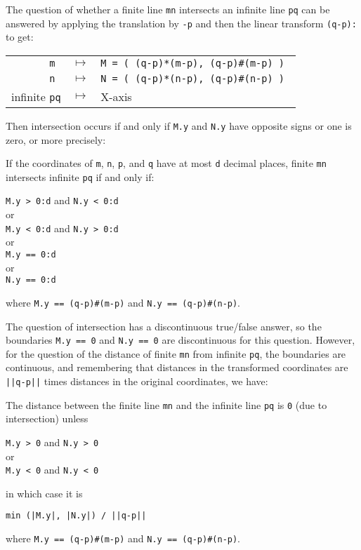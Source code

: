 \documentclass[12pt]{article}
\begin{document}
The question of whether a finite line {\tt mn} intersects an
infinite line {\tt pq} can be answered by applying the translation
by {\tt -p} and then the linear transform {\tt (q-p):} to get:
\begin{center}
\begin{tabular}{rcl}
\tt m & $\longmapsto$ & \tt M = ( (q-p)*(m-p), (q-p)\#(m-p) ) \\
\tt n & $\longmapsto$ & \tt N = ( (q-p)*(n-p), (q-p)\#(n-p) ) \\
infinite {\tt pq} & $\longmapsto$ & X-axis \\
\end{tabular}
\end{center}
Then intersection occurs if and only if {\tt M.y} and {\tt N.y}
have opposite signs or one is zero, or more precisely:
\begin{theorem}
If the coordinates of {\tt m},
{\tt n}, {\tt p}, and {\tt q} have at most {\tt d} decimal places,
finite {\tt mn} intersects infinite {\tt pq} if and only if:
\begin{center}
{\tt M.y > 0:d} and {\tt N.y < 0:d} \\
or \\
{\tt M.y < 0:d} and {\tt N.y > 0:d} \\
or \\
{\tt M.y == 0:d} \\
or \\
{\tt N.y == 0:d}
\end{center}
where {\tt M.y == (q-p)\#(m-p)} and {\tt N.y == (q-p)\#(n-p)}.
\end{theorem}
The question of intersection has a discontinuous true/false
answer, so the boundaries {\tt M.y == 0} and {\tt N.y == 0}
are discontinuous for this question.  However, for the
question of the distance of finite {\tt mn} from infinite {\tt pq},
the boundaries are continuous, and remembering that distances in
the transformed coordinates are {\tt ||q-p||} times distances
in the original coordinates, we have:
\begin{theorem}
The distance between the finite line {\tt mn} and the infinite
line {\tt pq} is {\tt 0} (due to intersection) unless
\begin{center}
{\tt M.y > 0} and {\tt N.y > 0} \\
or \\
{\tt M.y < 0} and {\tt N.y < 0} \\
\end{center}
in which case it is \\
\centerline{\tt min (|M.y|, |N.y|) / ||q-p||}

where {\tt M.y == (q-p)\#(m-p)} and {\tt N.y == (q-p)\#(n-p)}.
\end{theorem}
\end{document}
